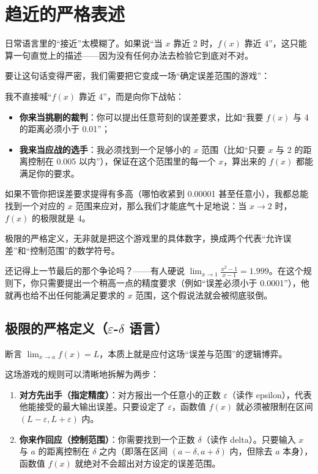\section{趋近的严格表述}
\label{sec:02-Calculus/02-Limits-and-Continuity/02}

日常语言里的``接近''太模糊了。如果说``当 \(x\) 靠近 2 时，\(f(x)\) 靠近 4''，这只能算一句直觉上的描述——因为没有任何办法去检验它到底对不对。

要让这句话变得严密，我们需要把它变成一场``确定误差范围的游戏''：

我不直接喊``\(f(x)\) 靠近 4''，而是向你下战帖：
\begin{itemize}
  \item \textbf{你来当挑剔的裁判}：你可以提出任意苛刻的误差要求，比如``我要 \(f(x)\) 与 4 的距离必须小于 0.01''；
  \item \textbf{我来当应战的选手}：我必须找到一个足够小的 \(x\) 范围（比如``只要 \(x\) 与 2 的距离控制在 0.005 以内''），保证在这个范围里的每一个 \(x\)，算出来的 \(f(x)\) 都能满足你的要求。
\end{itemize}

如果不管你把误差要求提得有多高（哪怕收紧到 0.00001 甚至任意小），我都总能找到一个对应的 \(x\) 范围来应对，那么我们才能底气十足地说：当 \(x\to 2\) 时，\(f(x)\) 的极限就是 4。

极限的严格定义，无非就是把这个游戏里的具体数字，换成两个代表``允许误差''和``控制范围''的数学符号。

还记得上一节最后的那个争论吗？——有人硬说 \(\lim_{x\to1} \frac{x^2-1}{x-1} = 1.999\)。在这个规则下，你只需要提出一个稍高一点的精度要求（例如``误差必须小于 0.0001''），他就再也给不出任何能满足要求的 \(x\) 范围，这个假说法就会被彻底驳倒。

\subsection{极限的严格定义（\(\varepsilon\)-\(\delta\) 语言）}

断言 \(\lim_{x\to a}f(x)=L\)，本质上就是应付这场``误差与范围''的逻辑博弈。

这场游戏的规则可以清晰地拆解为两步：
\begin{enumerate}
  \item \textbf{对方先出手（指定精度）}：对方报出一个任意小的正数 \(\varepsilon\)（读作 epsilon），代表他能接受的最大输出误差。只要设定了 \(\varepsilon\)，函数值 \(f(x)\) 就必须被限制在区间 \((L-\varepsilon, L+\varepsilon)\) 内。
  \item \textbf{你来作回应（控制范围）}：你需要找到一个正数 \(\delta\)（读作 delta）。只要输入 \(x\) 与 \(a\) 的距离控制在 \(\delta\) 之内（即落在区间 \((a-\delta, a+\delta)\) 内，但除去 \(a\) 本身），函数值 \(f(x)\) 就绝对不会超出对方设定的误差范围。
\end{enumerate}

